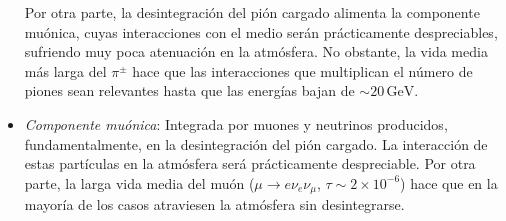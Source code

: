 \documentclass[12 pt, a4paper]{article} %
\numberwithin{equation}{section}
\numberwithin{figure}{section}
\numberwithin{table}{section}
\begin{document}
\begin{itemize}
Por otra parte, la desintegración del pión cargado alimenta la componente muónica, cuyas interacciones con el medio serán prácticamente despreciables, sufriendo muy poca atenuación en la atmósfera. No obstante, la vida media más larga del $\pi^\pm$ hace que las interacciones que multiplican el número de piones sean relevantes hasta que las energías bajan de $\sim 20\,\mathrm{GeV}$.
	\item\textit{Componente muónica}: Integrada por muones y neutrinos producidos, fundamentalmente, en la desintegración del pión cargado. La interacción de estas partículas en la atmósfera será prácticamente despreciable. Por otra parte, la larga vida media del muón ($\mu\rightarrow e\nu_e\nu_\mu$, $\tau\sim2\times10^{-6}$) hace que en la mayoría de los casos atraviesen la atmósfera sin desintegrarse.
\end{itemize}
\end{document}
